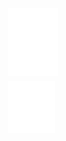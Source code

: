 \documentclass[10pt]{article}
\begin{document}
\includegraphics[max width=\textwidth, center]{2025_04_17_46e04c6acd873ea9558dg-231(1)}\\
\includegraphics[max width=\textwidth, center]{2025_04_17_46e04c6acd873ea9558dg-231(7)}
\end{document}
